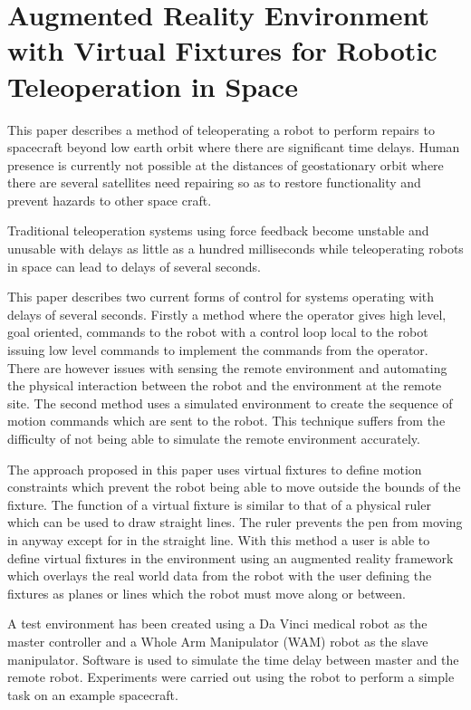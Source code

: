 \documentclass[13pt]{article}
\begin{document}
         
%

\section*{Augmented Reality Environment with Virtual Fixtures for Robotic Teleoperation in Space}

This paper describes a method of teleoperating a robot to perform repairs to spacecraft beyond low earth orbit where there are significant time delays. Human presence is currently not possible at the distances of geostationary orbit where there are several satellites need repairing so as to restore functionality and prevent hazards to other space craft.

Traditional teleoperation systems using force feedback become unstable and unusable with delays as little as a hundred milliseconds while teleoperating robots in space can lead to delays of several seconds.

This paper describes two current forms of control for systems operating with delays of several seconds. Firstly a method where the operator gives high level, goal oriented, commands to the robot with a control loop local to the robot issuing low level commands to implement the commands from the operator.  There are however issues with sensing the remote environment and automating the physical interaction between the robot and the environment at the remote site. The second method uses a simulated environment to create the sequence of motion commands which are sent to the robot. This technique suffers from the difficulty of not being able to simulate the remote environment accurately. 

The approach proposed in this paper uses virtual fixtures to define motion constraints which prevent the robot being able to move outside the bounds of the fixture. The function of a virtual fixture is similar to that of a physical ruler which can be used to draw straight lines. The ruler prevents the pen from moving in anyway except for in the straight line. With this method a user is able to define virtual fixtures in the environment using an augmented reality framework which overlays the real world data from the robot with the user defining the fixtures as planes or lines which the robot must move along or between.

A test environment has been created using a Da Vinci medical robot as the master controller and a Whole Arm Manipulator (WAM) robot as the slave manipulator. Software is used to simulate the time delay between master and the remote robot. Experiments were carried out using the robot to perform a simple task on an example spacecraft.
\end{document}
